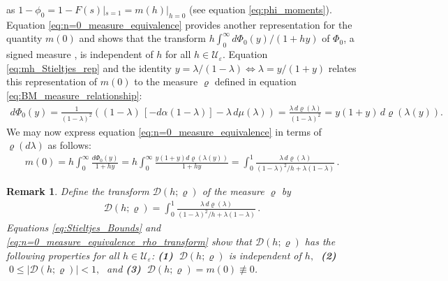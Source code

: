 \documentclass[english,12pt,jmp,graphicx]{revtex4-1}
\newtheorem{remark}{Remark}[section]
\newcommand{\ph}{\hat{\phi}}
\begin{document}
%
as $1-\phi_0=1-F(s)|_{s=1}=m(h)|_{h=0}$ (see equation
\eqref{eq:phi_moments}). Equation 
\eqref{eq:n=0_measure_equivalence} 
provides another representation for the quantity $m(0)$ and
shows that the transform $h\int_0^\infty d\Phi_0(y)/(1+hy)$ of $\Phi_0$, a signed
measure \cite{Rudin:87}, is independent of $h$ for all 
$h\in\mathcal{U}_\varepsilon$. Equation \eqref{eq:mh_Stieltjes_rep} and the
identity $y=\lambda/(1-\lambda)\iff\lambda=y/(1+y)$ relates this representation of $m(0)$
to the measure $\varrho$ defined in equation \eqref{eq:BM_measure_relationship}:         
%
\begin{align*}%
  d\Phi_0(y)%
        =\frac{1}{(1-\lambda)^2}((1-\lambda)\,[-d\alpha(1-\lambda)]-\lambda\,d\mu(\lambda))
        =\frac{\lambda\,d\varrho(\lambda)}{(1-\lambda)^2}=y(1+y)\,d\varrho\left(\lambda(y)\right).%
\end{align*}
%
We may now express equation \eqref{eq:n=0_measure_equivalence}
in terms of $\varrho(d\lambda)$ as follows: 
%
\begin{align}\label{eq:n=0_measure_equivalence_rho_transform}
  m(0)= h\int_0^\infty\frac{d\Phi_0(y)}{1+hy}
      =h\int_0^\infty\frac{y(1+y)d\varrho(\lambda(y))}{1+hy}
      =\int_0^1\frac{\lambda\,d\varrho(\lambda)}{(1-\lambda)^2/h+\lambda(1-\lambda)}\,.
\end{align}
%
%
\begin{remark}\label{rem:varrho_conditions}
  Define the transform $\mathcal{D}(h;\varrho)$ of the measure $\varrho$ by
  \begin{align}\label{eq:D_varrho}
    \mathcal{D}(h;\varrho)=\int_0^1\frac{\lambda\,d\varrho(\lambda)}{(1-\lambda)^2/h+\lambda(1-\lambda)}\,.
  \end{align}
  Equations \eqref{eq:Stieltjes_Bounds} and 
  \eqref{eq:n=0_measure_equivalence_rho_transform}
  show that $\mathcal{D}(h;\varrho)$ has the following properties for
  all $h\in\mathcal{U}_\varepsilon$:
  \newline
  \textbf{(1)} $\;\mathcal{D}(h;\varrho)$ is independent of $h,\;$ \textbf{(2)}
  $\;0\leq|\mathcal{D}(h;\varrho)|<1,\;$ and \textbf{(3)} $\;\mathcal{D}(h;\varrho)=m(0)\not\equiv0$. 
%  
\end{remark}
\end{document}

